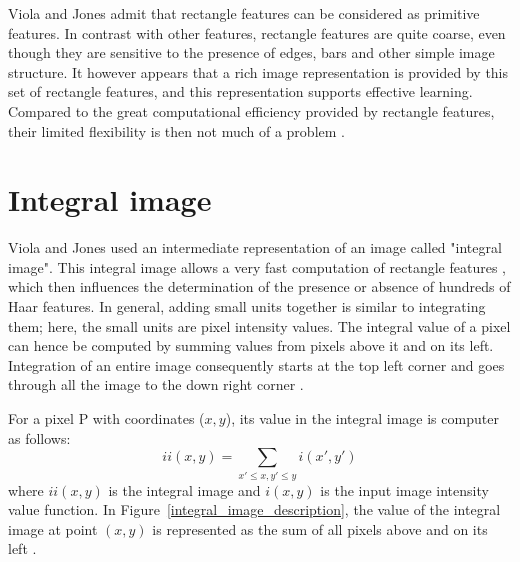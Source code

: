 \noindent Viola and Jones admit that rectangle features can be considered as primitive features. In contrast with other features, rectangle features are quite coarse, even though they are sensitive to the presence of edges, bars and other simple image structure. It however appears that a rich image representation is provided by this set of rectangle features, and this representation supports effective learning. Compared to the great computational efficiency provided by rectangle features, their limited flexibility is then not much of a problem \cite{VIO01}.
\newline

\section{Integral image}

\vspace{\baselineskip}
\noindent Viola and Jones used an intermediate representation of an image called "integral image". This integral image allows a very fast computation of rectangle features \cite{VIO01}, which then influences the determination of the presence or absence of hundreds of Haar features. In general, adding small units together is similar to integrating them; here, the small units are pixel intensity values. The integral value of a pixel can hence be computed by summing values from pixels above it and on its left. Integration of an entire image consequently starts at the top left corner and goes through all the image to the down right corner \cite{HEW07}.
\newline

\noindent For a pixel P with coordinates ($x,y$), its value in the integral image is computer as follows: \[ ii(x,y) = \sum_{x' \leq x,y' \leq y} i(x',y') \] where $ ii(x,y) $ is the integral image and $ i(x,y) $ is the input image intensity value function. In Figure~\ref{integral_image_description}, the value of the integral image at point $ (x,y) $ is represented as the sum of all pixels above and on its left \cite{VIO01}. 
\newline
	
